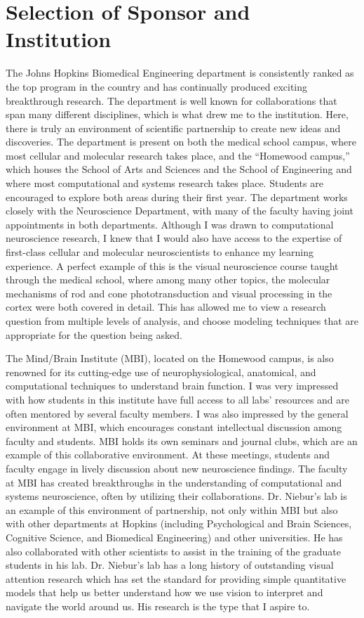 \documentclass[11pt,notitlepage]{article}
\begin{document}
\clearpage

\section*{Selection of Sponsor and Institution}

The Johns Hopkins Biomedical Engineering department is consistently ranked as the top program in the country and has continually produced exciting breakthrough research. The department is well known for collaborations that span many different disciplines, which is what drew me to the institution. Here, there is truly an environment of scientific partnership to create new ideas and discoveries. The department is present on both the medical school campus, where most cellular and molecular research takes place, and the ``Homewood campus,'' which houses the School of Arts and Sciences and the School of Engineering and where most computational and systems research takes place. Students are encouraged to explore both areas during their first year. The department works closely with the Neuroscience Department, with many of the faculty having joint appointments in both departments. Although I was drawn to computational neuroscience research, I knew that I would also have access to the expertise of first-class cellular and molecular neuroscientists to enhance my learning experience. A perfect example of this is the visual neuroscience course taught through the medical school, where among many other topics, the molecular mechanisms of rod and cone phototransduction and visual processing in the cortex were both covered in detail. This has allowed me to view a research question from multiple levels of analysis, and choose modeling techniques that are appropriate for the question being asked.

The Mind/Brain Institute (MBI), located on the Homewood campus, is also renowned for its cutting-edge use of neurophysiological, anatomical, and computational techniques to understand brain function. I was very impressed with how students in this institute have full access to all labs' resources and are often mentored by several faculty members. I was also impressed by the general environment at MBI, which encourages constant intellectual discussion among faculty and students. MBI holds its own seminars and journal clubs, which are an example of this collaborative environment. At these meetings, students and faculty engage in lively discussion about new neuroscience findings. The faculty at MBI has created breakthroughs in the understanding of computational and systems neuroscience, often by utilizing their collaborations. Dr. Niebur's lab is an example of this environment of partnership, not only within MBI but also with other departments at Hopkins (including Psychological and Brain Sciences, Cognitive Science, and Biomedical Engineering) and other universities. He has also collaborated with other scientists to assist in the training of the graduate students in his lab. Dr. Niebur's lab has a long history of outstanding visual attention research which has set the standard for providing simple quantitative models that help us better understand how we use vision to interpret and navigate the world around us. His research is the type that I aspire to.
\end{document}

